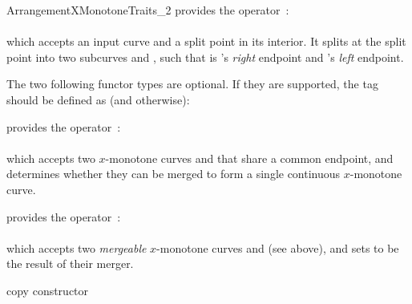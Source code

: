 \begin{ccRefConcept}{ArrangementXMonotoneTraits_2}
{provides the operator~: \\
  \\
 which accepts an input curve  and a split point  in its
 interior. It splits  at the split point into two subcurves 
 and , such that  is 's {\sl right} endpoint and
 's {\sl left} endpoint.} 

The two following functor types are optional. If they are supported, the
 tag should be defined as  (and
 otherwise):

{provides the operator~: \\
  \\
 which accepts two $x$-monotone curves  and  that share
 a common endpoint, and determines whether they can be merged to form a single
 continuous $x$-monotone curve.}

{provides the operator~: \\
  \\
 which accepts two {\sl mergeable} $x$-monotone curves  and 
 (see above), and sets  to be the result of their merger.} 

\ccCreation
{}

\ccThreeToTwo

\ccGlue
{}
{copy constructor}
\ccGlue
{}



 {}
\ccGlue
{} {}
\ccGlue
{} {}
\ccGlue
{} {}

\ccHasModels


\end{ccRefConcept}

